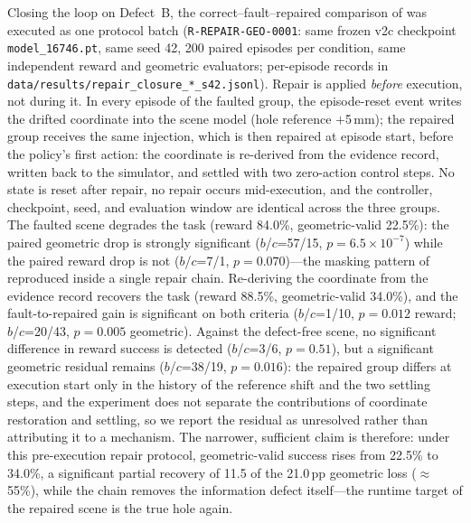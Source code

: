 Closing the loop on Defect~B, the correct--fault--repaired comparison of
 was executed as one protocol batch
(\texttt{R-REPAIR-GEO-0001}: same frozen v2c checkpoint
\texttt{model\_16746.pt}, same seed 42, 200 paired episodes per condition,
same independent reward and geometric evaluators; per-episode records in
\texttt{data/results/repair\_closure\_*\_s42.jsonl}). Repair is applied
\emph{before} execution, not during it. In every episode of the faulted
group, the episode-reset event writes the drifted coordinate into the scene
model (hole reference $+$5\,mm); the repaired group receives the same
injection, which is then repaired at episode start, before the policy's
first action: the coordinate is re-derived from the evidence record, written
back to the simulator, and settled with two zero-action control steps. No
state is reset after repair, no repair occurs mid-execution, and the
controller, checkpoint, seed, and evaluation window are identical across the
three groups. The faulted scene degrades the task (reward 84.0\%,
geometric-valid 22.5\%): the paired geometric drop is strongly significant
($b$/$c$=57/15, $p=6.5\times10^{-7}$) while the paired reward drop is not
($b$/$c$=7/1, $p=0.070$)---the masking pattern of
 reproduced inside a single repair chain.
Re-deriving the coordinate from the evidence record recovers the task
(reward 88.5\%, geometric-valid 34.0\%), and the fault-to-repaired gain is
significant on both criteria ($b$/$c$=1/10, $p=0.012$ reward; $b$/$c$=20/43,
$p=0.005$ geometric). Against the defect-free scene, no significant
difference in reward success is detected ($b$/$c$=3/6, $p=0.51$), but a
significant geometric residual remains ($b$/$c$=38/19, $p=0.016$): the
repaired group differs at execution start only in the history of the
reference shift and the two settling steps, and the experiment does not
separate the contributions of coordinate restoration and settling, so we
report the residual as unresolved rather than attributing it to a mechanism.
The narrower, sufficient claim is therefore: under this pre-execution repair
protocol, geometric-valid success rises from 22.5\% to 34.0\%, a significant
partial recovery of 11.5 of the 21.0\,pp geometric loss ($\approx$55\%),
while the chain removes the information defect itself---the runtime target
of the repaired scene is the true hole again.

